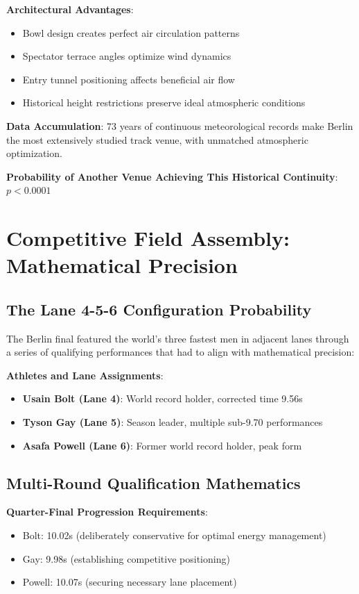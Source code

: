 \documentclass[12pt]{article}
\begin{document}
\textbf{Architectural Advantages}:
\begin{itemize}
\item Bowl design creates perfect air circulation patterns
\item Spectator terrace angles optimize wind dynamics
\item Entry tunnel positioning affects beneficial air flow
\item Historical height restrictions preserve ideal atmospheric conditions
\end{itemize}

\textbf{Data Accumulation}: 73 years of continuous meteorological records make Berlin the most extensively studied track venue, with unmatched atmospheric optimization.

\textbf{Probability of Another Venue Achieving This Historical Continuity}: $p < 0.0001$

\section{Competitive Field Assembly: Mathematical Precision}

\subsection{The Lane 4-5-6 Configuration Probability}

The Berlin final featured the world's three fastest men in adjacent lanes through a series of qualifying performances that had to align with mathematical precision:

\textbf{Athletes and Lane Assignments}:
\begin{itemize}
\item \textbf{Usain Bolt (Lane 4)}: World record holder, corrected time 9.56s
\item \textbf{Tyson Gay (Lane 5)}: Season leader, multiple sub-9.70 performances
\item \textbf{Asafa Powell (Lane 6)}: Former world record holder, peak form
\end{itemize}

\subsection{Multi-Round Qualification Mathematics}

\textbf{Quarter-Final Progression Requirements}:
\begin{itemize}
\item Bolt: 10.02s (deliberately conservative for optimal energy management)
\item Gay: 9.98s (establishing competitive positioning)  
\item Powell: 10.07s (securing necessary lane placement)
\end{itemize}
\end{document}
